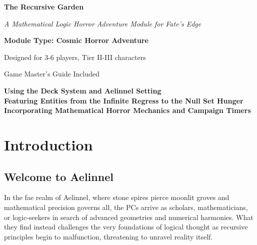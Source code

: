 \documentclass[11pt]{article}
\begin{document}
\begin{titlepage}
\centering
\vspace*{2cm}

{\Huge\bfseries\color{headercolor} The Recursive Garden} 

\vspace{0.5cm}

{\Large\itshape A Mathematical Logic Horror Adventure Module for Fate's Edge}

\vspace{2cm}

\vspace{2cm}

{\Large\bfseries Module Type: Cosmic Horror Adventure}

\vspace{1cm}

{\large Designed for 3-6 players, Tier II-III characters}

\vspace{1cm}

{\large Game Master's Guide Included}

\vfill

{\large 
\textbf{Using the Deck System and Aelinnel Setting} \\
\textbf{Featuring Entities from the Infinite Regress to the Null Set Hunger} \\
\textbf{Incorporating Mathematical Horror Mechanics and Campaign Timers}
}

\end{titlepage}

\newpage

\tableofcontents

\newpage

\section{Introduction}

\subsection{Welcome to Aelinnel}

In the fae realm of Aelinnel, where stone spires pierce moonlit groves and mathematical precision governs all, the PCs arrive as scholars, mathematicians, or logic-seekers in search of advanced geometries and numerical harmonies. What they find instead challenges the very foundations of logical thought as recursive principles begin to malfunction, threatening to unravel reality itself.
\end{document}
